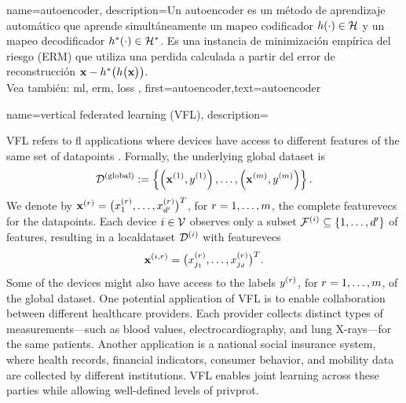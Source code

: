 {name={autoencoder},
	description={Un autoencoder es un método de aprendizaje automático que aprende simultáneamente un mapeo codificador
		$h(\cdot) \in \mathcal{H}$ y un mapeo decodificador $h^{*}(\cdot) \in \mathcal{H}^{*}$. 
		Es una instancia de minimización empírica del riesgo (ERM) que utiliza una perdida calculada a partir del error de reconstrucción 
		${\bf x} - h^{*}\big(  h \big( {\bf x} \big) \big)$.
		\\
		Vea también: \gls{ml}, \gls{erm}, \gls{loss} },
	first={autoencoder},text={autoencoder}
} 

{name={vertical federated learning (VFL)},
	description={
		VFL refers to \gls{fl} applications where  
		\glspl{device} have access to different \glspl{feature} of the same set of \glspl{datapoint} \cite{VFLChapter}. 
		Formally, the underlying global \gls{dataset} is
		\[
		\mathcal{D}^{(\mathrm{global})} := \left\{ \left({\bf x}^{(1)}, y^{(1)}\right), \ldots, \left({\bf x}^{(m)}, y^{(m)}\right) \right\}.
		\]
		We denote by ${\bf x}^{(r)} = \big( x^{(r)}_{1}, \ldots, x^{(r)}_{d'} \big)^{T}$, for $r=1,\ldots,m$, 
	     the complete \glspl{featurevec} for the \glspl{datapoint}. Each \gls{device} $i \in \mathcal{V}$ 
		observes only a subset $\mathcal{F}^{(i)} \subseteq \{1,\ldots,d'\}$ of \glspl{feature}, resulting 
		in a \gls{localdataset} $\mathcal{D}^{(i)}$ with \glspl{featurevec}
		\[
		{\bf x}^{(i,r)} = \big( x^{(r)}_{j_{1}}, \ldots, x^{(r)}_{j_{d}} \big)^{T}.
		\]
		Some of the \glspl{device} might also have access to the \glspl{label} $y^{(r)}$, for $r=1,\ldots,m$, 
		of the global \gls{dataset}. One potential application of VFL is to enable collaboration between 
		different healthcare providers. Each provider collects distinct types of measurements—such as blood 
		values, electrocardiography, and lung X-rays—for the same patients. Another application is a 
		national social insurance system, where health records, financial indicators, consumer behavior, 
		and mobility \gls{data} are collected by different institutions. VFL enables joint learning across 
		these parties while allowing well-defined levels of \gls{privprot}.
		\begin{figure}[H]

\end{figure}}}
